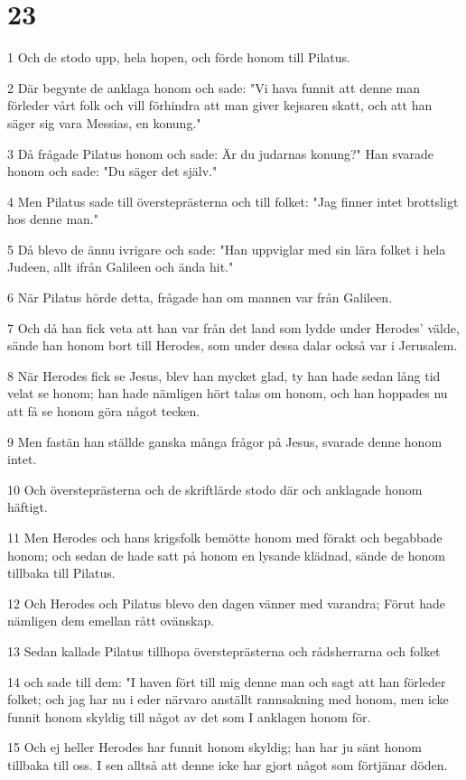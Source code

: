 \chapter{23}

\par 1 Och de stodo upp, hela hopen, och förde honom till Pilatus.
\par 2 Där begynte de anklaga honom och sade: "Vi hava funnit att denne man förleder vårt folk och vill förhindra att man giver kejsaren skatt, och att han säger sig vara Messias, en konung."
\par 3 Då frågade Pilatus honom och sade: Är du judarnas konung?" Han svarade honom och sade: "Du säger det själv."
\par 4 Men Pilatus sade till översteprästerna och till folket: "Jag finner intet brottsligt hos denne man."
\par 5 Då blevo de ännu ivrigare och sade: "Han uppviglar med sin lära folket i hela Judeen, allt ifrån Galileen och ända hit."
\par 6 När Pilatus hörde detta, frågade han om mannen var från Galileen.
\par 7 Och då han fick veta att han var från det land som lydde under Herodes' välde, sände han honom bort till Herodes, som under dessa dalar också var i Jerusalem.
\par 8 När Herodes fick se Jesus, blev han mycket glad, ty han hade sedan lång tid velat se honom; han hade nämligen hört talas om honom, och han hoppades nu att få se honom göra något tecken.
\par 9 Men fastän han ställde ganska många frågor på Jesus, svarade denne honom intet.
\par 10 Och översteprästerna och de skriftlärde stodo där och anklagade honom häftigt.
\par 11 Men Herodes och hans krigsfolk bemötte honom med förakt och begabbade honom; och sedan de hade satt på honom en lysande klädnad, sände de honom tillbaka till Pilatus.
\par 12 Och Herodes och Pilatus blevo den dagen vänner med varandra; Förut hade nämligen dem emellan rått ovänskap.
\par 13 Sedan kallade Pilatus tillhopa översteprästerna och rådsherrarna och folket
\par 14 och sade till dem: "I haven fört till mig denne man och sagt att han förleder folket; och jag har nu i eder närvaro anställt rannsakning med honom, men icke funnit honom skyldig till något av det som I anklagen honom för.
\par 15 Och ej heller Herodes har funnit honom skyldig; han har ju sänt honom tillbaka till oss. I sen alltså att denne icke har gjort något som förtjänar döden.
